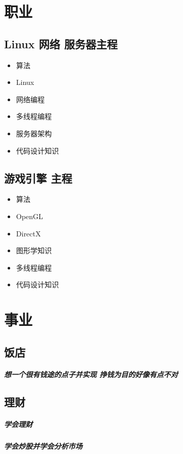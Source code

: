 \documentclass[UTF8,a4paper,8pt]{ctexbook}
\begin{document}
\chapter{职业}   
	\section{Linux 网络 服务器主程}
		\begin{itemize}
			\item 算法
			\item Linux
			\item 网络编程
			\item 多线程编程
			\item 服务器架构
			\item 代码设计知识
		\end{itemize}
		
	\section{游戏引擎 主程}
		\begin{itemize}
			\item 算法
			\item OpenGL 
			\item DirectX
			\item 图形学知识
			\item 多线程编程
			\item 代码设计知识
		\end{itemize}
		
\chapter{事业}   
    \section{饭店}
	    \paragraph{想一个很有钱途的点子并实现 \quad 挣钱为目的好像有点不对}
	    
	\section{理财}
	    \paragraph{学会理财}
	    \paragraph{学会炒股并学会分析市场}
	    
\end{document}
